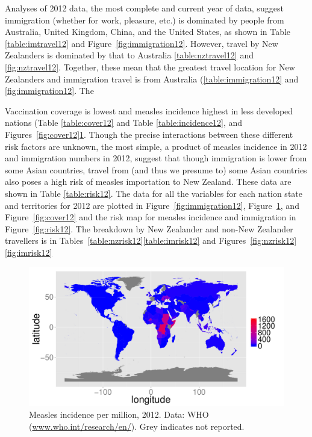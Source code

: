 \documentclass{article}
\begin{document}
Analyses of 2012 data, the most complete and current year of data, suggest immigration (whether for work, pleasure, etc.) is dominated by people from Australia, United Kingdom, China, and the United States, as shown in Table \ref{table:imtravel12} and Figure~\ref{fig:immigration12}. However, travel by New Zealanders is dominated by that to Australia \ref{table:nztravel12} and \ref{fig:nztravel12}. Together, these mean that the greatest travel location for New Zealanders and immigration travel is from Australia (\ref{table:immigration12} and \ref{fig:immigration12}. The 



Vaccination coverage is lowest and measles incidence highest in less developed nations (Table \ref{table:cover12} and Table \ref{table:incidence12}, and Figures~\ref{fig:cover12}\ref{fig:incidence12}. Though the precise interactions between these different risk factors are unknown, the most simple, a product of measles incidence in 2012 and immigration numbers in 2012, suggest that though immigration is lower from some Asian countries, travel from (and thus we presume to) some Asian countries also poses a high risk of measles importation to New Zealand. These data are shown in Table \ref{table:risk12}. The data for all the variables for each nation state and territories for 2012 are plotted in Figure~\ref{fig:immigration12}, Figure~\ref{fig:incidence12}, and Figure~\ref{fig:cover12} and the risk map for measles incidence and immigration in Figure~\ref{fig:risk12}. The breakdown by New Zealander and non-New Zealander travellers is in Tables~\ref{table:nzrisk12}\ref{table:imrisk12} and Figures~\ref{fig:nzrisk12}\ref{fig:imrisk12}


\begin{figure}
\begin{center}
\includegraphics{draftfinalreport-037}
\end{center}
\caption{Measles incidence per million, 2012. Data: WHO (\href{http://www.who.int/research/en/}{www.who.int/research/en/}). Grey indicates not reported.}
\label{fig:incidence12}
\end{figure}
\end{document}
